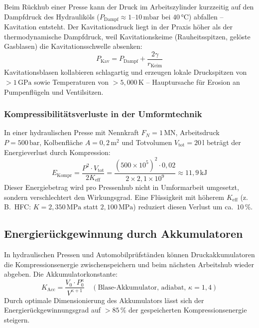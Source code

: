 ﻿\documentclass[a4paper,12pt]{scrreprt}
\theoremstyle{definition}
\begin{document}
Beim Rückhub einer Presse kann der Druck im Arbeitszylinder kurzzeitig
auf den Dampfdruck des Hydrauliköls ($P_{\mathrm{Dampf}} \approx 1$--$10\,\mathrm{mbar}$
bei $40\, °\mathrm{C}$) abfallen -- Kavitation entsteht. Der
Kavitationsdruck liegt in der Praxis höher als der thermodynamische
Dampfdruck, weil Kavitationskeime (Rauheitsspitzen, gelöste Gasblasen)
die Kavitationsschwelle absenken:
\begin{equation}
  P_{\mathrm{Kav}} = P_{\mathrm{Dampf}} + \frac{2\gamma}{r_{\mathrm{Keim}}}
  \label{eq:kavitations_druck}
\end{equation}
Kavitationsblasen kollabieren schlagartig und erzeugen lokale Druckspitzen
von $>1\,\mathrm{GPa}$ sowie Temperaturen von $>5{,}000\,\mathrm{K}$ --
Hauptursache für Erosion an Pumpenflügeln und Ventilsitzen.

\subsubsection{Kompressibilitätsverluste in der Umformtechnik}

In einer hydraulischen Presse mit Nennkraft $F_N = 1\,\mathrm{MN}$,
Arbeitsdruck $P = 500\,\mathrm{bar}$, Kolbenfläche $A = 0{,}2\,\mathrm{m}^2$
und Totvolumen $V_{\mathrm{tot}} = 20\,\mathrm{l}$ beträgt der
Energieverlust durch Kompression:
\begin{equation}
  E_{\mathrm{Kompr}} = \frac{P^2 \cdot V_{\mathrm{tot}}}{2 K_{\mathrm{eff}}}
    = \frac{(500 \times 10^5)^2 \cdot 0{,}02}{2 \times 2{,}1 \times 10^9}
    \approx 11{,}9\,\mathrm{kJ}
  \label{eq:energie_kompr}
\end{equation}
Dieser Energiebetrag wird pro Pressenhub nicht in Umformarbeit umgesetzt,
sondern verschlechtert den Wirkungsgrad. Eine Flüssigkeit mit
höherem $K_{\mathrm{eff}}$ (z.\,B.\ HFC: $K = 2{,}350\,\mathrm{MPa}$ statt
$2{,}100\,\mathrm{MPa}$) reduziert diesen Verlust um ca.\ $10\,\%$.

\subsection{Energierückgewinnung durch Akkumulatoren}

In hydraulischen Pressen und Automobilprüfständen können Druckakkumulatoren
die Kompressionsenergie zwischenspeichern und beim nächsten Arbeitshub
wieder abgeben. Die Akkumulatorkonstante:
\begin{equation}
  K_{\mathrm{Acc}} = \frac{V_0 \cdot P_0^\kappa}{V^{\kappa + 1}}
    \quad (\text{Blase-Akkumulator, adiabat, } \kappa = 1{,}4)
  \label{eq:akku_konstante}
\end{equation}
Durch optimale Dimensionierung des Akkumulators lässt sich der
Energierückgewinnungsgrad auf $>85\,\%$ der gespeicherten
Kompressionsenergie steigern.
\end{document}
